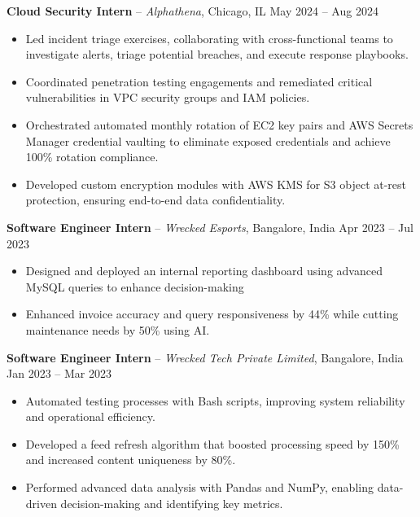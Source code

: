 \documentclass[10pt, letterpaper]{article}
\begin{document}
\textbf{\textcolor{myNavy}{Cloud Security Intern}} -- \textit{Alphathena}, Chicago, IL \hfill \textcolor{myDarkGray}{May 2024 -- Aug 2024}
\begin{itemize}[leftmargin=*, itemsep=-1pt, parsep=0pt]
    \item Led incident triage exercises, collaborating with cross-functional teams to investigate alerts, triage potential breaches, and execute response playbooks.
    \item Coordinated penetration testing engagements and remediated critical vulnerabilities in VPC security groups and IAM policies.
    \item Orchestrated automated monthly rotation of EC2 key pairs and AWS Secrets Manager credential vaulting to eliminate exposed credentials and achieve 100\% rotation compliance.
    \item Developed custom encryption modules with AWS KMS for S3 object at-rest protection, ensuring end-to-end data confidentiality.
\end{itemize}

\textbf{\textcolor{myNavy}{Software Engineer Intern}} -- \textit{Wrecked Esports}, Bangalore, India \hfill \textcolor{myDarkGray}{Apr 2023 -- Jul 2023}
\begin{itemize}[leftmargin=*, itemsep=-1pt, parsep=0pt]
    \item Designed and deployed an internal reporting dashboard using advanced MySQL queries to enhance decision-making
    \item Enhanced invoice accuracy and query responsiveness by 44\% while cutting maintenance needs by 50\% using AI.
\end{itemize}

\textbf{\textcolor{myNavy}{Software Engineer Intern}} -- \textit{Wrecked Tech Private Limited}, Bangalore, India \hfill \textcolor{myDarkGray}{Jan 2023 -- Mar 2023}
\begin{itemize}[leftmargin=*, itemsep=-1pt, parsep=0pt]
    \item Automated testing processes with Bash scripts, improving system reliability and operational efficiency.
    \item Developed a feed refresh algorithm that boosted processing speed by 150\% and increased content uniqueness by 80\%.
    \item Performed advanced data analysis with Pandas and NumPy, enabling data-driven decision-making and identifying key metrics.
\end{itemize}
\end{document}
